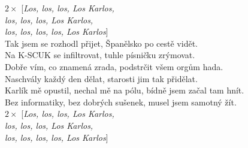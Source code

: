 
$2\times$ [\emph{Los, los, los, Los Karlos,\\
los, los, los, Los Karlos,\\
los, los, los, los, Los Karlos}]\\

Tak jsem se rozhodl přijet, Španělsko po cestě vidět.\\
Na K-SCUK se infiltrovat, tuhle písničku zrýmovat.\\

Dobře vím, co znamená zrada, podstrčit všem orgům hada.\\
Naschvály každý den dělat, starosti jim tak přidělat.\\

Karlík mě opustil, nechal mě na pólu, bídně jsem začal tam hnít.\\
Bez informatiky, bez dobrých sušenek, musel jsem samotný žít.\\

$2\times$ [\emph{Los, los, los, Los Karlos,\\
los, los, los, Los Karlos,\\
los, los, los, los, Los Karlos}]

\newpage
